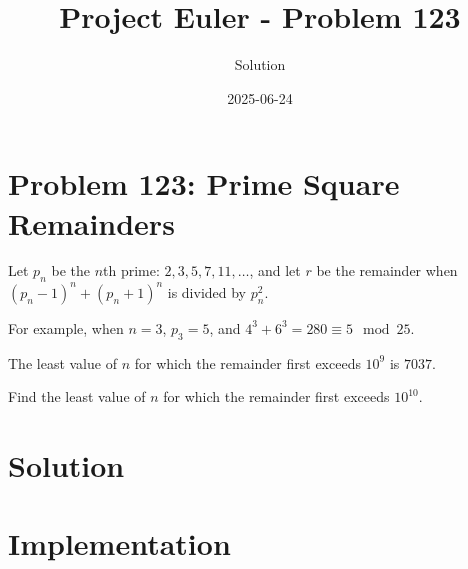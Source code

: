 \documentclass{article}
\title{Project Euler - Problem 123}
\author{Solution}
\date{2025-06-24}
\begin{document}
\maketitle

\section*{Problem 123: Prime Square Remainders}


Let $p_n$ be the $n$th prime: $2, 3, 5, 7, 11, \dots$, and let $r$ be the remainder when $(p_n - 1)^n + (p_n + 1)^n$ is divided by $p_n^2$.

\par
For example, when $n = 3$, $p_3 = 5$, and $4^3 + 6^3 = 280 \equiv 5 \mod 25$.

\par
The least value of $n$ for which the remainder first exceeds $10^9$ is $7037$.

\par
Find the least value of $n$ for which the remainder first exceeds $10^{10}$.

\par


\section*{Solution}


\section*{Implementation}

\end{document}
